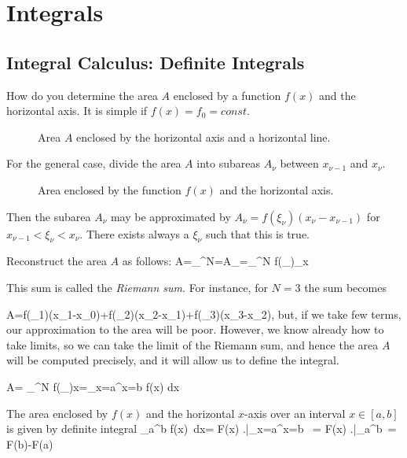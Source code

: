 
\section{Integrals}

\subsection{Integral Calculus: Definite Integrals}
How do you determine the area $A$ enclosed by a function $f(x)$
and the horizontal axis. It is simple if $f(x)=f_0=const$. \vs
\begin{figure}[!h]
    \centerline{\epsfxsize=12cm }
    \caption{Area $A$ enclosed by the horizontal axis and a horizontal line.} \label{fig22}
\end{figure} \vs

For the general case, divide the area $A$ into subareas
$A_{\nu}$ between $x_{\nu-1}$ and $x_{\nu}$. \vs
\begin{figure}[!h]
    \centerline{\epsfxsize=12cm  }
    \caption{Area enclosed by the function $f(x)$ and the horizontal axis.} \label{fig23}
\end{figure} \vs

Then the subarea $A_{\nu}$ may be approximated by
$A_{\nu}=f(\xi_{\nu}) ( x_{\nu}-x_{\nu-1} )$ for $x_{\nu-1}<\xi_{\nu}<x_{\nu}$.
There exists always a $\xi_{\nu}$ such that this is true.

Reconstruct the area $A$ as follows:
\bnn
A=\sum_{}^N=A_{\nu}=\sum_{}^N f(\xi_{\nu})_{\Delta x}
\enn

This sum is called the {\em Riemann sum}. For instance, for $N=3$ the sum becomes

\bnn
A=f(\xi_1)(x_1-x_0)+f(\xi_2)(x_2-x_1)+f(\xi_3)(x_3-x_2),
\enn
but, if we take few terms, our approximation to the area will be poor. However, we know already
how to take limits, so we can take the limit of the Riemann sum, and hence the area $A$ will
be computed precisely, and it will allow us to define the integral.

\bnn
A= \sum_{}^N f(\xi_{\nu})\Delta x=\int_{x=a}^{x=b} \: f(x)\: dx
\enn

The area enclosed by $f(x)$ and the horizontal $x$-axis over an interval $x \in [a,b]$ is given by
definite integral
\bnn 
\int_a^b \: f(x)\, dx= F(x)\! \left.\frac{}{}\right|_{x=a}^{x=b} \,
= F(x)\! \left.\frac{}{}\right|_a^b \,= F(b)-F(a) 
\enn

